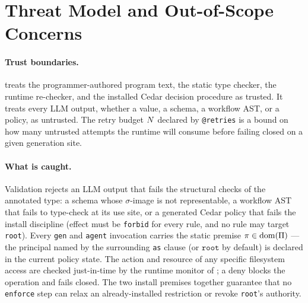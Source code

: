 \appendix

\section{Threat Model and Out-of-Scope Concerns}
\label{app:threat}

\paragraph{Trust boundaries.} \pact treats the programmer-authored program text,
the static type checker, the runtime re-checker, and the installed Cedar
decision procedure as trusted. It treats every LLM output, whether a value, a
schema, a workflow AST, or a policy, as untrusted. The retry budget $N$
declared by \texttt{@retries} is a bound on how many untrusted attempts the
runtime will consume before failing closed on a given generation site.

\paragraph{What is caught.} Validation rejects an LLM output that fails the
structural checks of the annotated type: a schema whose $\sigma$-image is not
representable, a workflow AST that fails to type-check at its use site, or a
generated Cedar policy that fails the install discipline (effect must be
\texttt{forbid} for every rule, and no rule may target \texttt{root}). Every
\texttt{gen} and \texttt{agent} invocation carries the static premise
$\pi \in \mathrm{dom}(\Pi)$ --- the principal named by the surrounding
\texttt{as} clause (or $\texttt{root}$ by default) is declared in the current
policy state. The action and resource of any specific filesystem access are
checked just-in-time by the runtime monitor of ; a deny
blocks the operation and fails closed. The two install premises together
guarantee that no \texttt{enforce} step can relax an already-installed
restriction or revoke \texttt{root}'s authority.

